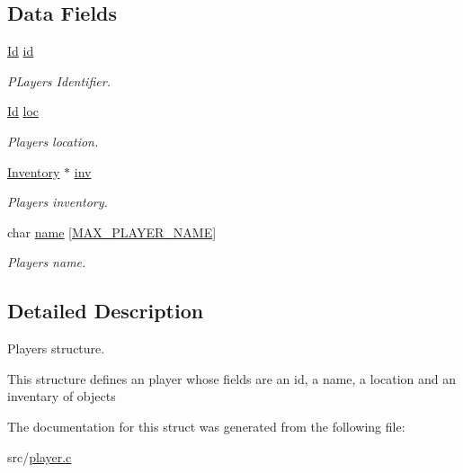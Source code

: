 \subsection*{Data Fields}
\begin{DoxyCompactItemize}
\item 
\mbox{\label{struct__Player_a60d635cd063816a9c1bd873f4868bb90}} 
\hyperlink{types_8h_a845e604fb28f7e3d97549da3448149d3}{Id} \hyperlink{struct__Player_a60d635cd063816a9c1bd873f4868bb90}{id}
\begin{DoxyCompactList}\small\item\em P\+Layer\textquotesingle{}s Identifier. \end{DoxyCompactList}\item 
\mbox{\label{struct__Player_a40f39335ccf0d2de882b7588f1917e58}} 
\hyperlink{types_8h_a845e604fb28f7e3d97549da3448149d3}{Id} \hyperlink{struct__Player_a40f39335ccf0d2de882b7588f1917e58}{loc}
\begin{DoxyCompactList}\small\item\em Player\textquotesingle{}s location. \end{DoxyCompactList}\item 
\mbox{\label{struct__Player_aaaeeb03326c37ce62c333c2b94fde23c}} 
\hyperlink{inventory_8h_a2253bf64ac4ce6a9c1d6f39c0b0d32a3}{Inventory} $\ast$ \hyperlink{struct__Player_aaaeeb03326c37ce62c333c2b94fde23c}{inv}
\begin{DoxyCompactList}\small\item\em Player\textquotesingle{}s inventory. \end{DoxyCompactList}\item 
\mbox{\label{struct__Player_a420ab57f90210b41b45063eec232f0a0}} 
char \hyperlink{struct__Player_a420ab57f90210b41b45063eec232f0a0}{name} \mbox{[}\hyperlink{player_8h_a17e4584e6f22ba5f1b29f6c6db21fdfb}{M\+A\+X\+\_\+\+P\+L\+A\+Y\+E\+R\+\_\+\+N\+A\+ME}\mbox{]}
\begin{DoxyCompactList}\small\item\em Player\textquotesingle{}s name. \end{DoxyCompactList}\end{DoxyCompactItemize}


\subsection{Detailed Description}
Player\textquotesingle{}s structure. 

This structure defines an player whose fields are an id, a name, a location and an inventary of objects 

The documentation for this struct was generated from the following file\+:\begin{DoxyCompactItemize}
\item 
src/\hyperlink{player_8c}{player.\+c}\end{DoxyCompactItemize}
